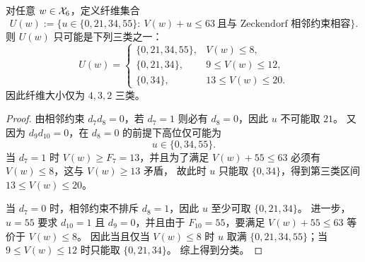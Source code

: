 \begin{theorem}[纤维分类]
对任意 $w\in\mathcal{X}_6$，定义纤维集合
$$
U(w):=\{u\in\{0,21,34,55\}:\ V(w)+u\le 63\ \text{且与 Zeckendorf 相邻约束相容}\}.
$$
则 $U(w)$ 只可能是下列三类之一：
$$
U(w)=
\begin{cases}
\{0,21,34,55\}, & V(w)\le 8,\\
\{0,21,34\}, & 9\le V(w)\le 12,\\
\{0,34\}, & 13\le V(w)\le 20.
\end{cases}
$$
因此纤维大小仅为 $4,3,2$ 三类。
\end{theorem}

\begin{proof}
由相邻约束 $d_7d_8=0$，若 $d_7=1$ 则必有 $d_8=0$，因此 $u$ 不可能取 $21$。
又因为 $d_9d_{10}=0$，在 $d_8=0$ 的前提下高位仅可能为
$$
u\in\{0,34,55\}.
$$
当 $d_7=1$ 时 $V(w)\ge F_7=13$，并且为了满足 $V(w)+55\le 63$ 必须有 $V(w)\le 8$，这与 $V(w)\ge 13$ 矛盾，
故此时 $u$ 只能取 $\{0,34\}$，得到第三类区间 $13\le V(w)\le 20$。

当 $d_7=0$ 时，相邻约束不排斥 $d_8=1$，因此 $u$ 至少可取 $\{0,21,34\}$。
进一步，$u=55$ 要求 $d_{10}=1$ 且 $d_9=0$，并且由于 $F_{10}=55$，要满足 $V(w)+55\le 63$ 等价于 $V(w)\le 8$。
因此当且仅当 $V(w)\le 8$ 时 $u$ 取满 $\{0,21,34,55\}$；当 $9\le V(w)\le 12$ 时只能取 $\{0,21,34\}$。
综上得到分类。
\end{proof}

